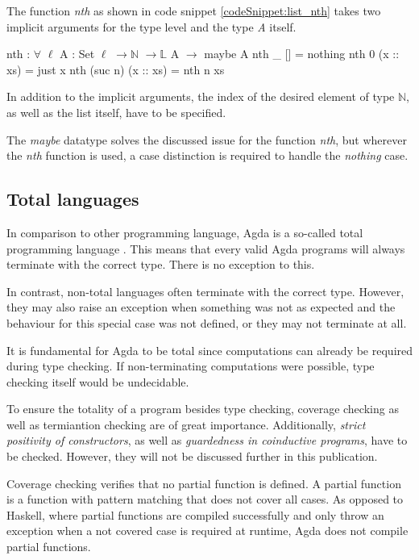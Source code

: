 The function \emph{nth} as shown in code snippet \ref{codeSnippet:list_nth} takes two implicit arguments for the type level and the type \emph{A} itself.

\begin{codesnippet}[mathescape=true, caption={Definition of nth function in Agda}, label={codeSnippet:list_nth}]
nth : $\forall$ {$\ell$} {A : Set $\ell$} $\rightarrow \mathbb{N}$ $\rightarrow \mathbb{L}$ A $\rightarrow$ maybe A
nth _ [] = nothing
nth 0 (x :: xs) = just x
nth (suc n) (x :: xs) = nth n xs
\end{codesnippet}

In addition to the implicit arguments, the index of the desired element of type $\mathbb{N}$, as well as the list itself, have to be specified.

The \emph{maybe} datatype solves the discussed issue for the function \emph{nth}, but wherever the \emph{nth} function is used, a case distinction is required to handle the \emph{nothing} case.

\subsection{Total languages}\label{section:total_languages}
In comparison to other programming language, Agda is a so-called total programming language \cite{AgdaReadTheDocs}.
This means that every valid Agda programs will always terminate with the correct type. There is no exception to this.

In contrast, non-total languages often terminate with the correct type. 
However, they may also raise an exception when something was not as expected and the behaviour for this special case was not defined, or they may not terminate at all.

It is fundamental for Agda to be total since computations can already be required during type checking.
If non-terminating computations were possible, type checking itself would be undecidable\cite{agda_wiki_totality}.

To ensure the totality of a program besides type checking, coverage checking as well as termiantion checking are of great importance. 
Additionally, \emph{strict positivity of constructors}, as well as \emph{guardedness in coinductive programs}, have to be checked. However, they will not be discussed further in this publication.

Coverage checking verifies that no partial function is defined. A partial function is a function with pattern matching that does not cover all cases.
As opposed to Haskell, where partial functions are compiled successfully and only throw an exception when a not covered case is required at runtime, Agda does not compile partial functions.

